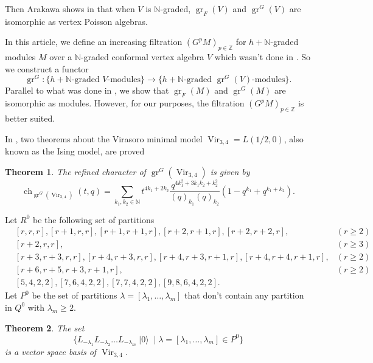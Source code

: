 \documentclass[a4paper, 12pt, reqno]{amsart}
\newtheorem{theorem}{Theorem}[section]
\theoremstyle{remark}
\DeclareMathOperator{\Vir}{Vir}
\DeclareMathOperator{\gr}{gr}
\DeclareMathOperator{\ch}{ch}
\DeclareMathOperator{\vac}{|0\rangle}
\begin{document}
Then Arakawa shows in \cite[Proposition 2.6.1]{arakawa_remark_2012} that when $V$ is $\mathbb{N}$-graded, $\gr_F(V)$ and $\gr^G(V)$ are isomorphic as vertex Poisson algebras.

In this article, we define an increasing filtration $(G^pM)_{p \in \mathbb{Z}}$ for $h + \mathbb{N}$-graded modules $M$ over a $\mathbb{N}$-graded conformal vertex algebra $V$ which wasn't done in \cite{li_vertex_2004}.
So we construct a functor
\begin{equation*}
  \gr^G: \{\text{$h + \mathbb{N}$-graded $V$-modules}\} \to \{\text{$h + \mathbb{N}$-graded $\gr^G(V)$-modules}\}.
\end{equation*}
Parallel to what was done in \cite{arakawa_remark_2012}, we show that $\gr_F(M)$ and $\gr^G(M)$ are isomorphic as modules.
However, for our purposes, the filtration $(G^pM)_{p \in \mathbb{Z}}$ is better suited.

In \cite{andrews_singular_2022}, two theorems about the Virasoro minimal model $\Vir_{3, 4} = L(1/2, 0)$, also known as the Ising model, are proved

\begin{theorem}
  \label{thr:1}
  The refined character of $\gr^G(\Vir_{3,4})$ is given by
  \begin{equation*}
    \ch_{\gr^G(\Vir_{3, 4})}(t, q) = \sum_{k_1, k_2 \in \mathbb{N}}t^{4k_1 + 2k_2}\frac{q^{4k_1^2 + 3k_1k_2 + k_2^2}}{(q)_{k_1}(q)_{k_2}}(1 - q^{k_1} + q^{k_1 + k_2}).
  \end{equation*}
\end{theorem}

Let $R^0$ be the following set of partitions
\begin{align*}
  &[r, r, r], [r + 1, r, r], [r + 1, r + 1, r], [r + 2, r + 1, r], [r + 2, r + 2, r], &(r \ge 2) \\
  &[r + 2, r, r], &(r \ge 3) \\
  &[r + 3, r + 3, r, r], [r + 4, r + 3, r, r],  [r + 4, r + 3, r + 1, r], [r + 4, r + 4, r + 1, r], &(r \ge 2) \\
  &[r + 6, r + 5, r + 3, r + 1, r], &(r \ge 2) \\
  &[5, 4, 2, 2], [7, 6, 4, 2, 2], [7, 7, 4, 2, 2], [9, 8, 6, 4, 2, 2].
\end{align*}
Let $P^0$ be the set of partitions $\lambda = [\lambda_1, \dots, \lambda_m]$ that don't contain any partition in $Q^0$ with $\lambda_m \ge 2$.

\begin{theorem}
  \label{thr:2}
  The set
  \begin{equation*}
    \{L_{-\lambda_1}L_{-\lambda_2}\dots L_{-\lambda_m}\vac \mid \lambda = [\lambda_1, \dots, \lambda_m] \in P^0\}
  \end{equation*}
  is a vector space basis of $\Vir_{3, 4}$.
\end{theorem}
\end{document}
